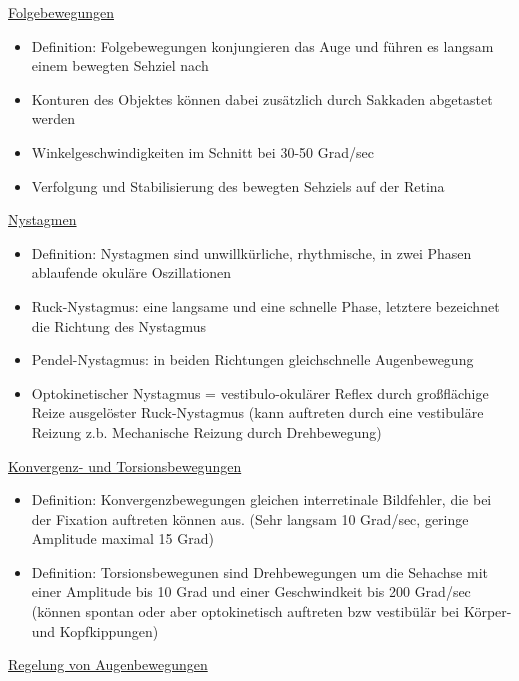 \documentclass[a4paper,10pt,oneside]{article}
\begin{document}
\underline{Folgebewegungen} \\
	\begin{itemize}
		\item Definition: Folgebewegungen konjungieren das Auge und führen es langsam einem bewegten Sehziel nach
		\item Konturen des Objektes können dabei zusätzlich durch Sakkaden abgetastet werden
		\item Winkelgeschwindigkeiten im Schnitt bei 30-50 Grad/sec
		\item Verfolgung und Stabilisierung des bewegten Sehziels auf der Retina
	\end{itemize}
	
\underline{Nystagmen} \\
	\begin{itemize}
		\item Definition: Nystagmen sind unwillkürliche, rhythmische, in zwei Phasen ablaufende okuläre Oszillationen
		\item Ruck-Nystagmus: eine langsame und eine schnelle Phase, letztere bezeichnet die Richtung des Nystagmus
		\item Pendel-Nystagmus: in beiden Richtungen gleichschnelle Augenbewegung
		\item Optokinetischer Nystagmus = vestibulo-okulärer Reflex durch großflächige Reize ausgelöster Ruck-Nystagmus (kann auftreten durch eine vestibuläre Reizung z.b. Mechanische Reizung durch Drehbewegung)
	\end{itemize}
	
\underline{Konvergenz- und Torsionsbewegungen} \\
	\begin{itemize}
		\item Definition: Konvergenzbewegungen gleichen interretinale Bildfehler, die bei der Fixation auftreten können aus. (Sehr langsam 10 Grad/sec, geringe Amplitude maximal 15 Grad)
		\item Definition: Torsionsbewegunen sind Drehbewegungen um die Sehachse mit einer Amplitude bis 10 Grad und einer Geschwindkeit bis 200 Grad/sec (können spontan oder aber optokinetisch auftreten bzw vestibülär bei Körper- und Kopfkippungen)
	\end{itemize}
	
\underline{Regelung von Augenbewegungen} \\
\end{document}
